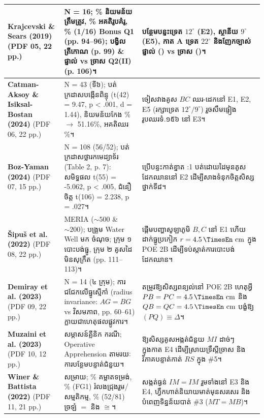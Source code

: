 \documentclass[a4paper,12pt]{article}
\newcommand{\en}[1]{{\TimesEn #1}}
\newcommand{\unit}[1]{\,\text{\en{#1}}}
\newcommand{\cnum}[1]{{\TimesEn\fontsize{10.5pt}{12pt}\selectfont\ding{\numexpr181+#1\relax}}}
\newcommand{\cg}{\ensuremath{\cong}}
\begin{document}
\begin{longtable}{|L{3.35cm}|L{6.75cm}|L{6.80cm}|}
\hline
\en{\textbf{Krajcevski \& Sears (2019)}} \newline (\en{PDF 05, 22 pp.}) & \en{N = 16}; \en{25\%} និយមន័យត្រឹមត្រូវ, \en{44\%} អគតិរូបគំរូ, \en{6\% (1/16)} \en{Bonus Q1 (pp. 94--96)}; បង្វិលត្រីកោណ (\en{p. 99}) \& ផ្ទាល់ vs ច្រាស \en{Q2(II) (p. 106)}។ & បន្ថែមបន្ទះទ្រេត $12^\circ$ (\en{E2}), ស្ថានីយ $9^\circ$ (\en{E5}), កាត \en{A} ទ្រេត $22^\circ$ និងញែកច្បាស់ផ្ទាល់ (\cnum{4}) vs ច្រាស (\cnum{5})។ \\
\hline
\en{\textbf{Catman-Aksoy \& Isiksal-Bostan (2024)}} \newline (\en{PDF 06, 22 pp.}) & \en{N = 43} (ទី៦); បត់ក្រដាសបង្កើនពិន្ទុ (\en{t(42) = 9.47, p < .001, d = 1.44}), និយមន័យកែង \en{37.20\% $\to$ 51.16\%}, អគតិឈរ \en{9.30\%}។ & ចៀសវាងគូស $BC$ ឈរ-ដេកនៅ \en{E1, E2, E5} (រក្សាទ្រេត $12^\circ/9^\circ$) រួចសឹមផ្ទៀងរូបឈរទំ.១៥៦ នៅ \en{E3}។ \\
\hline
\en{\textbf{Boz-Yaman (2024)}} \newline (\en{PDF 07, 15 pp.}) & \en{N = 108 (56/52)}; បត់ក្រដាសថ្លារកមេដ្យាទ័រ (\en{Table 2, p. 7}): សមិទ្ធផល \en{t(55) = -5.062, p < .005}, ជំនឿចិត្ត \en{t(106) = 2.238, p = .027}។ & ប្រើបន្ទះកាត់ខ្នាត \en{1:1} បត់ដោយដៃមុនគូសដែកឈាននៅ \en{E2} ដើម្បីសាងទំនុកចិត្តសិស្សថ្នាក់ទី៨។ \\
\hline
\en{\textbf{Šipuš et al. (2022)}} \newline (\en{PDF 08, 22 pp.}) & \en{MERIA ($\sim 500$ \& $\sim 200$)}; បង្រួម \en{Water Well} មក \en{2} ចំណុច; ក្រុម ១ បោះបង់ធ្នូ, ក្រុម ២ គូសដៃមិនសុក្រឹត (\en{pp. 111--113})។ & ផ្ដើមបញ្ហាសូឡាភូមិ $B, C$ នៅ \en{E1} ហើយដាក់ធ្នូប្រកៀក $r=4.5\unit{cm}$ ក្នុង \en{POE 2B} ដើម្បីទប់ស្កាត់ការបោះបង់ដែកឈាន។ \\
\hline
\en{\textbf{Demiray et al. (2023)}} \newline (\en{PDF 09, 22 pp.}) & \en{N = 14} (៤ ក្រុម); ការជជែកលើធ្នូស្មើកាំ (\en{radius invariance}: $AG=BG$ vs វិសមភាព, \en{pp. 60--61}) ក្លាយជាហេតុផលផ្លូវការ។ & តម្រូវឱ្យសិស្សពន្យល់នៅ \en{POE 2B} ហេតុអ្វី $PB=PC=4.5\unit{cm}$ និង $QB=QC=4.5\unit{cm}$ បង្ខំឱ្យ $(PQ)\equiv\Delta$។ \\
\hline
\en{\textbf{Muzaini et al. (2023)}} \newline (\en{PDF 10, 12 pp.}) & សម្ភាសន៍គ្លីនិក \en{12} ករណី; \en{Operative Apprehension} តាមរយៈការបន្ថែមបន្ទាត់ជំនួយ។ & ឱ្យសិស្សគូសអង្កត់ជំនួយ $MI$ ដាច់ៗ ក្នុងកាត \en{E4} ដើម្បីស្រាយទ្រឹស្ដីច្រាស និងវិភាគបន្ទាត់កាត់ $RS$ ក្នុង \en{\#5}។ \\
\hline
\en{\textbf{Winer \& Battista (2022)}} \newline (\en{PDF 11, 21 pp.}) & \en{84} សម្រាយ; \en{72.5\%} គម្លាតទម្រង់, \en{49\% (FG1)} រំលងជ្រុងរួម/សម្មតិកម្ម, \en{64\% (52/81)} ច្រឡំ \en{$=$} និង \en{$\cg$}។ & សង្កត់ធ្ងន់ $IM=IM$ រួមទាំងនៅ \en{E3} និង \en{E4}, ហ្វឹកហាត់និយាយមាត់មុនសរសេរ និងបំពេញទិន្នន័យបាត់ \en{\#3} ($MT=MB$)។ \\

\end{longtable}
\end{document}
